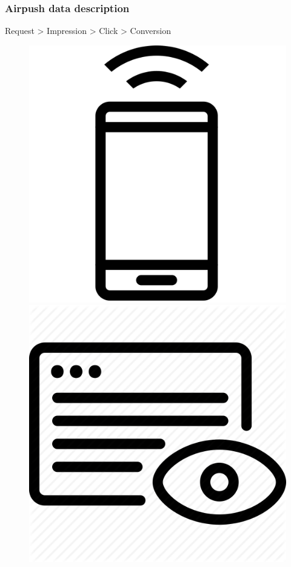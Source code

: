 \documentclass[intlimits, 9pt, unicode]{beamer}
\begin{document}
\begin{frame}
\frametitle{Airpush data description}

     Request > Impression > Click > Conversion
     
\begin{figure}
\includegraphics[scale=0.02]{images/scheme_request}
\includegraphics[scale=0.05]{images/scheme_impression}

\end{figure}
\end{frame}
\end{document}
